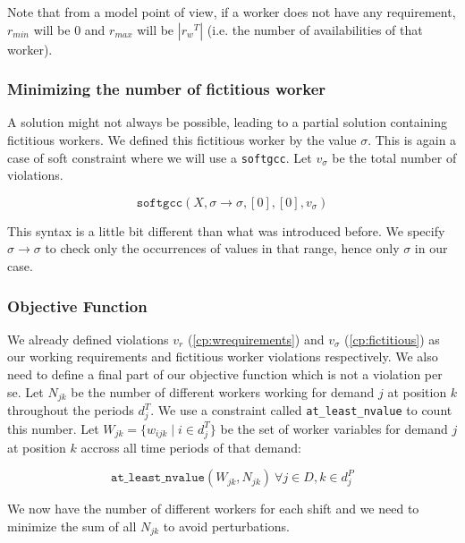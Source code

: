 \documentclass[../../thesis.tex]{subfiles}
\begin{document}
Note that from a model point of view, if a worker does not have any requirement, $r_{min}$ will be 0 and $r_{max}$ will be $|{r_w}^T| $ (i.e. the number of availabilities of that worker).

\subsubsection{Minimizing the number of fictitious worker}

A solution might not always be possible, leading to a partial solution containing fictitious workers.
We defined this fictitious worker by the value $\sigma$. This is again a case of soft constraint where 
we will use a \texttt{softgcc}. Let $v_{\sigma}$ be the total number of violations.


\begin{equation}
  \texttt{softgcc}(X, \sigma \rightarrow \sigma, [0], [0], v_{\sigma}) \label{cp:fictitious}
\end{equation}

This syntax is a little bit different than what was introduced before. We specify $\sigma \rightarrow \sigma$ to check only the occurrences of values 
in that range, hence only $\sigma$ in our case.


\subsubsection{Objective Function}

We already defined violations $v_r$ (\ref{cp:wrequirements}) and $v_{\sigma}$ (\ref{cp:fictitious}) as our working requirements and fictitious worker violations respectively.
We also need to define a final part of our objective function which is not a violation per se. Let $N_{jk}$ be the number 
of different workers working for demand $j$ at position $k$ throughout the periods $d_j^T$. We use a 
constraint called \texttt{at\_least\_nvalue} to count this number.
Let  $W_{jk} = \{ w_{ijk} \mid i \in d^T_j \}$ be the set of worker variables for demand $j$ at position $k$ accross all time periods of that demand:

\begin{equation}
  \texttt{at\_least\_nvalue}(W_{jk}, N_{jk}) \ \forall j \in D, k \in d^P_j
\end{equation}

We now have the number of different workers for each shift and we need to minimize the sum of all $N_{jk}$ to avoid perturbations.
\end{document}
